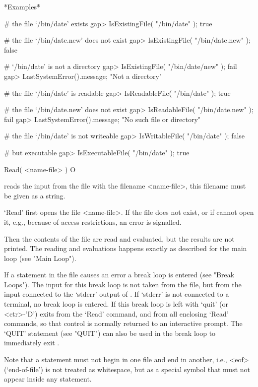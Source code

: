 *Examples*

\beginexample
# the file `/bin/date' exists
gap> IsExistingFile( "/bin/date" );    
true

# the file `/bin/date.new' does not exist
gap> IsExistingFile( "/bin/date.new" );
false

# `/bin/date' is not a directory
gap> IsExistingFile( "/bin/date/new" );
fail
gap> LastSystemError().message;
"Not a directory"

# the file `/bin/date' is readable
gap> IsReadableFile( "/bin/date" );
true

# the file `/bin/date.new' does not exist
gap> IsReadableFile( "/bin/date.new" );
fail
gap> LastSystemError().message;        
"No such file or directory"

# the file `/bin/date' is not writeable
gap> IsWritableFile( "/bin/date" );
false

# but executable
gap> IsExecutableFile( "/bin/date" );
true
\endexample



\>Read( <name-file> ) O

reads   the input from  the  file  with  the  filename <name-file>,  this
filename must be given as a string.

`Read' first opens the file <name-file>.  If the file  does not exist, or
if {\GAP} cannot open it, e.g., because of access restrictions,
an error is signalled.

Then the contents of the file are read and evaluated, but the results are
not printed.  The reading and evaluations happens exactly as described
for the main loop (see "Main Loop").

If a statement in the file causes an error a break loop is entered (see
"Break Loops").  The input for this break loop is not taken from the
file, but from the input connected to the `stderr' output of {\GAP}.  If
`stderr' is not connected to a terminal, no break loop is entered.  If
this break loop is left with `quit' (or <ctr>-'D') {\GAP} exits from the
`Read' command, and from all enclosing `Read' commands, so that control
is normally returned to an interactive prompt. The `QUIT' statement (see
"QUIT") can also be used in the break loop to immediately exit {\GAP}.

Note that  a statement must  not begin in one  file  and end  in another,
i.e.,  <eof> (`end-of-file') is not    treated as whitespace,  but as   a
special symbol that must not appear inside any statement.

